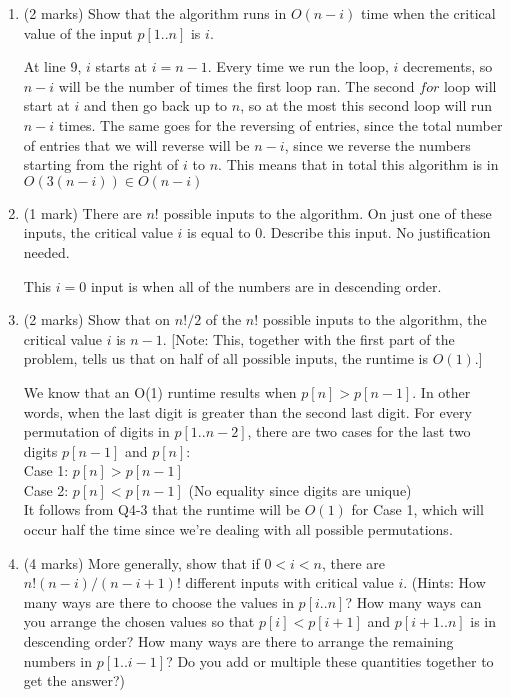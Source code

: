 \documentclass[11pt]{article}
\begin{document}
\begin{enumerate}
\item (2 marks)
Show that the algorithm runs in $O(n-i)$ time when the critical value of the input $p[1..n]$ is $i$.

\begin{soln}
At line 9, $i$ starts at $i=n-1$. Every time we run the loop, $i$ decrements, so $n-i$ will be the number of times the first loop ran. The second $for$ loop will start at $i$ and then go back up to $n$, so at the most this second loop will run $n-i$ times. The same goes for the reversing of entries, since the total number of entries that we will reverse will be $n-i$, since we reverse the numbers starting from the right of $i$ to $n$. This means that in total this algorithm is in $O(3(n-i)) \in O(n-i)$
\end{soln}

\item (1 mark)
  There are $n!$ possible inputs to the algorithm. On just one of these inputs,
  the critical value $i$ is equal to $0$. Describe this input. No justification needed.
  
  \begin{soln}
  This $i=0$ input is when all of the numbers are in descending order.
  \end{soln}

\item (2 marks)
Show that on $n!/2$ of the $n!$ possible inputs to the algorithm, the critical value $i$ is $n-1$. [Note: This, together with the first part of the problem, tells us that on half of all possible inputs, the runtime is $O(1)$.]

\begin{soln}
We know that an O(1) runtime results when $p[n] > p[n-1]$. In other words, when the last digit is greater than the second last digit. For every permutation of digits in $p[1..n-2]$, there are two cases for the last two digits $p[n-1]$ and $p[n]$: \\

Case 1: $p[n] > p[n-1]$ \\
Case 2: $p[n] < p[n-1]$ (No equality since digits are unique) \\

It follows from Q4-3 that the runtime will be $O(1)$ for Case 1, which will occur half the time since we're dealing with all possible permutations.
\end{soln}

\item (4 marks)
More generally, show that if $0 < i < n$,
there are $n!  (n-i)/ (n-i+1)!$ different inputs with critical value $i$.
(Hints: How many ways are there to choose the values in $p[i..n]$? How many ways can you arrange the chosen values so that $p[i] < p[i+1]$ and $p[i+1..n]$ is in descending order? How many ways are there to arrange the remaining numbers in $p[1..i-1]$? Do you add or multiple these quantities together to get the answer?)


\end{enumerate}
\end{document}
